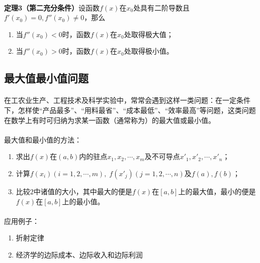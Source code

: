 \paragraph{}
\textbf{定理3（第二充分条件）\;}设函数$f(x)$在$x_0$处具有二阶导数且$f'(x_0)=0, f''(x_0) \neq 0$，那么
\begin{enumerate}
  \item 当$f''(x_0)<0$时，函数$f(x)$在$x_0$处取得极大值；
  \item 当$f''(x_0)>0$时，函数$f(x)$在$x_0$处取得极小值。
\end{enumerate}

\subsection{最大值最小值问题}
\paragraph{}
在工农业生产、工程技术及科学实验中，常常会遇到这样一类问题：在一定条件下，怎样使“产品最多”、“用料最省”、“成本最低”、“效率最高”等问题，这类问题在数学上有时可归纳为求某一函数（通常称为）的最大值或最小值。

\paragraph{}
最大值和最小值的方法：
\begin{enumerate}
  \item 求出$f(x)$在$(a,b)$内的驻点$x_1,x_2, \cdots, x_m$及不可导点$x'_1,x'_2,\cdots,x'_n$；
  \item 计算$f(x_i)(i=1,2,\cdots,m), \; f(x'_j)(j=1,2,\cdots,n)$及$f(a),f(b)$；
  \item 比较$2$中诸值的大小，其中最大的便是$f(x)$在$[a,b]$上的最大值，最小的便是$f(x)$在$[a,b]$上的最小值。
\end{enumerate}

\paragraph{}
应用例子：
\begin{enumerate}
  \item 折射定律
  \item 经济学的边际成本、边际收入和边际利润
\end{enumerate}
